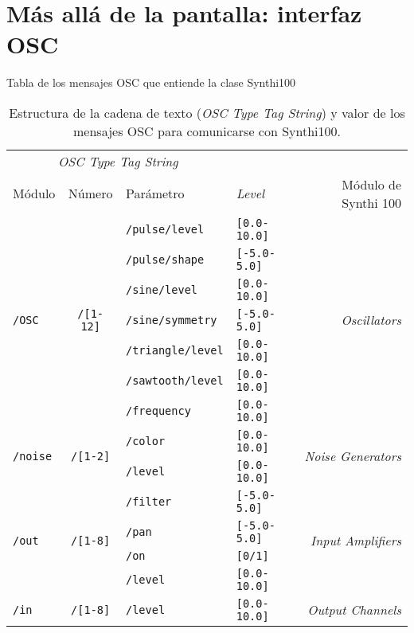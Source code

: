 \section{Más allá de la pantalla: interfaz OSC}

Tabla de los mensajes OSC que entiende la clase Synthi100

\begin{table}
	\begin{center}
		\begin{tabular}{ lcllr }
			\multicolumn{3}{c}{\textit{OSC Type Tag String}} \\
			\cline{1-3}
			Módulo			& Número			& Parámetro				& \textit{Level} 	& Módulo de Synthi 100 \\
			
			\hline 
			\multirow{7}{*}{\texttt{/OSC}}	& \multirow{7}{*}{\texttt{/[1-12]}}	& \texttt{/pulse/level}	&\texttt{[0.0-10.0]} & \multirow{7}{*}{\textit{Oscillators}}\\
			& & \texttt{/pulse/shape} & \texttt{[-5.0-5.0]} & \\
			& & \texttt{/sine/level} & \texttt{[0.0-10.0]} & \\
			& & \texttt{/sine/symmetry} & \texttt{[-5.0-5.0]} &\\
			& & \texttt{/triangle/level} & \texttt{[0.0-10.0]}  &\\
			& & \texttt{/sawtooth/level} & \texttt{[0.0-10.0]} &\\
			& & \texttt{/frequency} & \texttt{[0.0-10.0]} &\\
			
			\hline
			\multirow{2}{*}{\texttt{/noise}}	& \multirow{2}{*}{\texttt{/[1-2]}}	& \texttt{/color}	&\texttt{[0.0-10.0]} & \multirow{2}{*}{\textit{Noise Generators}}\\
			& & \texttt{/level} &\texttt{[0.0-10.0]}& \\
			\hline
			
			\multirow{4}{*}{\texttt{/out}}	& \multirow{4}{*}{\texttt{/[1-8]}}	& \texttt{/filter}	&\texttt{[-5.0-5.0]} & \multirow{4}{*}{\textit{Input Amplifiers}}\\
			& & \texttt{/pan} & \texttt{[-5.0-5.0]} & \\
			& & \texttt{/on} & \texttt{[0/1]} & \\
			& & \texttt{/level} & \texttt{[0.0-10.0]} &\\
			\hline
			
			\multirow{1}{*}{\texttt{/in}}	& \multirow{1}{*}{\texttt{/[1-8]}}	& \texttt{/level}	&\texttt{[0.0-10.0]} & \multirow{1}{*}{\textit{Output Channels}}\\
			\hline
			
		\end{tabular}
		\caption[Estructura de los mensajes OSC]{Estructura de la cadena de texto (\textit{OSC Type Tag String}) y valor de los mensajes OSC para comunicarse con Synthi100.}
		\label{table:osc}
	\end{center}
\end{table}